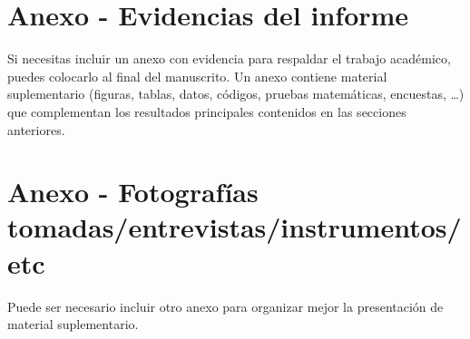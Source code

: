 \documentclass[11pt,a4paper]{article}
\begin{document}



\appendix
\section{Anexo - Evidencias del informe}
Si necesitas incluir un anexo con evidencia para respaldar el trabajo académico, puedes colocarlo al final del manuscrito.
Un anexo contiene material suplementario (figuras, tablas, datos, códigos, pruebas matemáticas, encuestas, \dots)
que complementan los resultados principales contenidos en las secciones anteriores.

\section{Anexo - Fotografías tomadas/entrevistas/instrumentos/etc}
Puede ser necesario incluir otro anexo para organizar mejor la presentación de material suplementario.

\end{document}
